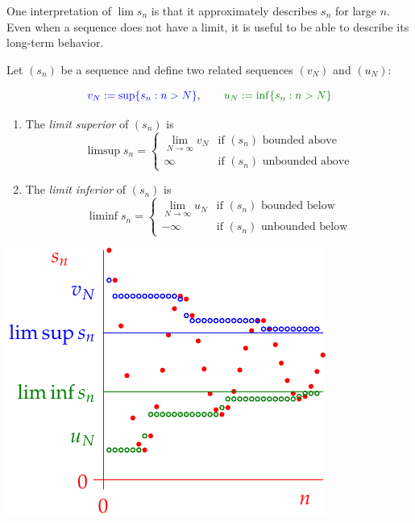 \vspace{-8pt}


\goodbreak




One interpretation of $\lim s_n$ is that it approximately describes $s_n$ for large $n$. Even when a sequence does not have a limit, it is useful to be able to describe its long-term behavior.

\begin{defn}{}{}
	Let $(s_n)$ be a sequence and define two related sequences $(v_N)$ and $(u_N)$:\par
	\begin{minipage}[t]{0.6\linewidth}\vspace{-14pt}
		\[
			\textcolor{blue}{v_N:=\sup\{s_n:n>N\}},\qquad \textcolor{Green}{u_N:=\inf\{s_n:n>N\}}
		\]
		\begin{enumerate}\itemsep0pt
		  \item The \emph{limit superior} of $(s_n)$ is
		  \[
		  	\limsup s_n=
		  	\begin{cases}
		  		\lim\limits_{N\to\infty}\!v_N\!\!&\text{if $(s_n)$ bounded above}\\
		  		\infty&\text{if $(s_n)$ unbounded above}
		  	\end{cases}
		  \]
		  \item The \emph{limit inferior} of $(s_n)$ is
		  \[
		  	\liminf s_n=
		  	\begin{cases}
		  		\lim\limits_{N\to\infty}\!u_N\!\!&\text{if $(s_n)$ bounded below}\\
		  		-\infty&\text{if $(s_n)$ unbounded below}
		  	\end{cases}
		  \]
		\end{enumerate}
	\end{minipage}
	\hfill
	\begin{minipage}[t]{0.39\linewidth}\vspace{0pt}
		\hfill\includegraphics[scale=0.95]{limsup5}
	\end{minipage}
\end{defn}

